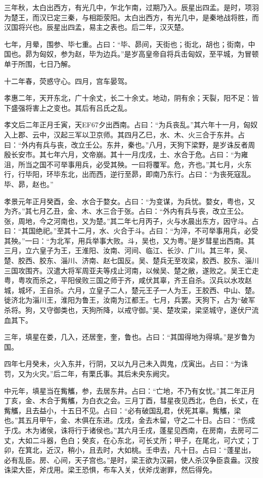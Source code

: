 \documentclass[]{article}
\begin{document}
三年秋，太白出西方，有光几中，乍北乍南，过期乃入。辰星出四孟。是时，项羽为楚王，而汉已定三秦，与相距荥阳。太白出西方，有光几中，是秦地战将胜，而汉国将兴也。辰星出四孟，易主之表也。后二年，汉灭楚。

七年，月晕，围参、毕七重。占曰：``毕、昴间，天街也；街北，胡也；街南，中国也。昴为匈奴，参为赵，毕为边兵。''是岁高皇帝自将兵击匈奴，至平城，为冒顿单于所围，七日乃解。

十二年春，荧惑守心。四月，宫车晏驾。

孝惠二年，天开东北，广十余丈，长二十余丈。地动，阴有余；天裂，阳不足：皆下盛强将害上之变也。其后有吕氏之乱。

孝文后二年正月壬寅，天EF67夕出西南。占曰：``为兵丧乱。''其六年十一月，匈奴入上郡、云中，汉起三军以卫京师。其四月乙巳，水、木、火三合于东井。占曰：``外内有兵与丧，改立壬公。东井，秦也。''八月，天狗下梁野，是岁诛反者周殷长安市。其七年六月，文帝崩。其十一月戊戌，土、水合于危。占曰：``为雍沮，所当之国不可举事用兵，必受其殃。一曰将覆军。危，齐也。''其七月，火东行，行毕阳，环毕东北，出而西，逆行至昴，即南乃东行。占曰：``为丧死寇乱。毕、昴，赵也。''

孝景元年正月癸酉，金、水合于婺女。占曰：``为变谋，为兵忧。婺女，粤也，又为齐。''其七月乙丑，金、木、水三合于张。占曰：``外内有兵与丧，改立王公。张，周地，今之河南也，又为楚。''其二年七月丙子，火与水晨出东方，因守斗。占曰：``其国绝祀。''至其十二月，水、火合于斗。占曰：``为淬，不可举事用兵，必受其殃。''一曰：``为北军，用兵举事大败。斗，吴也，又为粤。''是岁彗星出西南。其三月，立六皇子为王，王淮阳、汝南、河间、临江、长沙、广川。其三年，吴、楚、胶西、胶东、淄川、济南、赵七国反。吴、楚兵无至攻梁，胶西、胶东、淄川三国攻围齐。汉遣大将军周亚夫等戍止河南，以候吴、楚之敝，遂败之。吴王亡走粤，粤攻而杀之，平阳侯败三国之师于齐，咸伏其辜，齐王自杀。汉兵以水攻赵城，城坏，王自杀。六月，立皇子二人，楚元王子一人为王，王胶西、中山、楚。徙济北为淄川王，淮阳为鲁王，汝南为江都王。七月，兵罢。天狗下，占为``破军杀将。狗，又守御类也，天狗所降，以戒守御。''吴、楚攻梁，梁坚城守，遂伏尸流血其下。

三年，填星在娄，几入，还居奎，奎，鲁也。占曰：``其国得地为得填。''是岁鲁为国。

四年七月癸未，火入东并，行阴，又以九月己未入舆鬼，戊寅出。占曰：``为诛罚，又为火灾。''后二年，有栗氏事。其后未央东阙灾。

中元年，填星当在觜觿，参，去居东井。占曰：``亡地，不乃有女忧。''其二年正月丁亥，金、木合于觜觿，为白衣之会。三月丁酉，彗星夜见西北，色白，长丈，在觜觿，且去益小，十五日不见。占曰：``必有破国乱君，伏死其辜。觜觿，梁也。''其五月甲午，金、木俱在东进。戊戌，金去木留，守之二十日。占曰：``伤成于戊。木为诸侯，诛将行于诸侯也。''其六月壬戌，蓬星见西南，在房南，去房可二丈，大如二斗器，色白；癸亥，在心东北，可长丈所；甲子，在尾北，可六丈；丁卯，在箕北，近汉，稍小，且去时，大如桃。壬申去，凡十日。占曰：``蓬星出，必有乱臣。房、心间，天子宫也。''是时，梁王欲为汉嗣，使人杀汉争臣袁盎。汉按诛梁大臣，斧戊用。梁王恐惧，布车入关，伏斧戊谢罪，然后得免。
\end{document}
